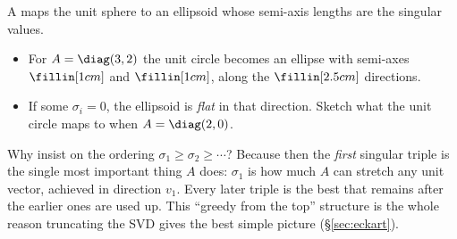 \begin{yourturn}
A maps the unit sphere to an ellipsoid whose semi-axis lengths are the singular values.
\begin{itemize}[leftmargin=1.3em,itemsep=1pt]
  \item For $A=\diag(3,2)$ the unit circle becomes an ellipse with semi-axes $\fillin[1cm]$ and
        $\fillin[1cm]$, along the $\fillin[2.5cm]$ directions.
  \item If some $\sigma_i=0$, the ellipsoid is \emph{flat} in that direction. Sketch what the
        unit circle maps to when $A=\diag(2,0)$. 
\end{itemize}
\workspace[2]
\end{yourturn}

\begin{strand}
Why insist on the ordering $\sigma_1\ge\sigma_2\ge\cdots$? Because then the \emph{first} singular
triple is the single most important thing $A$ does: $\sigma_1$ is how much $A$ can stretch any
unit vector, achieved in direction $v_1$. Every later triple is the best that remains after the
earlier ones are used up. This ``greedy from the top'' structure is the whole reason truncating
the SVD gives the best simple picture (§\ref{sec:eckart}).
\end{strand}

